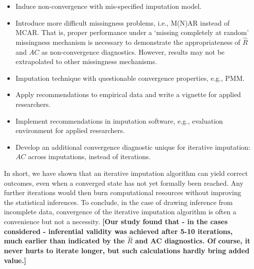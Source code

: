 \documentclass[Royal,times,sageh]{sagej}
\begin{document}
\begin{itemize}
\item
  Induce non-convergence with mis-specified imputation model.
\item
  Introduce more difficult missingness problems, i.e., M(N)AR instead of MCAR. That is, proper performance under a `missing completely at random' missingness mechanism is necessary to demonstrate the appropriateness of \(\widehat{R}\) and \(AC\) as non-convergence diagnostics. However, results may not be extrapolated to other missingness mechanisms.
\item
  Imputation technique with questionable convergence properties, e.g., PMM.
\item
  Apply recommendations to empirical data and write a vignette for applied researchers.
\item
  Implement recommendations in imputation software, e.g., evaluation environment for applied researchers.
\item
  Develop an additional convergence diagnostic unique for iterative imputation: \(AC\) across imputations, instead of iterations.
\end{itemize}

In short, we have shown that an iterative imputation algorithm can yield correct outcomes, even when a converged state has not yet formally been reached. Any further iterations would then burn computational resources without improving the statistical inferences. To conclude, in the case of drawing inference from incomplete data, convergence of the iterative imputation algorithm is often a convenience but not a necessity. \textbf{{[}Our study found that - in the cases considered - inferential validity was achieved after 5-10 iterations, much earlier than indicated by the \(\widehat{R}\) and AC diagnostics. Of course, it never hurts to iterate longer, but such calculations hardly bring added value.{]}}



\end{document}
